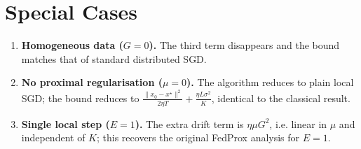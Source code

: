 \documentclass{article}
\begin{document}
\section*{Special Cases}
\begin{enumerate}[label=\alph*.]
\item \textbf{Homogeneous data ($G=0$).} The third term disappears and
    the bound matches that of standard distributed SGD.
\item \textbf{No proximal regularisation ($\mu=0$).}
    The algorithm reduces to plain local SGD; the bound reduces to
    $\frac{\|x_0-x^\star\|^2}{2\eta T}+\frac{\eta L\sigma^2}{K}$,
    identical to the classical result.
\item \textbf{Single local step ($E=1$).}
    The extra drift term is $ \eta\mu G^2$, i.e. linear in $\mu$ and
    independent of $K$; this recovers the original FedProx analysis
    for $E=1$.
\end{enumerate}
\end{document}
